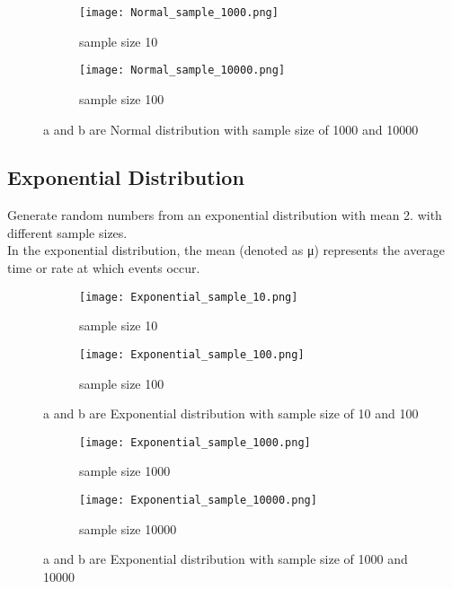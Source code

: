 \documentclass[12pt]{article}
\begin{document}
\begin{figure}[htb!]
    \centering
    \begin{subfigure}{0.45\textwidth}
        \centering
        \texttt{[image: Normal\_sample\_1000.png]}
        \caption{sample size 10}
        \label{fig:sub1}
    \end{subfigure}
    \hfill
    \begin{subfigure}{0.45\textwidth}
        \centering
        \texttt{[image: Normal\_sample\_10000.png]} 
        \caption{sample size 100}
        \label{fig:sub2}
    \end{subfigure}
    \caption{a and b are Normal distribution with sample size of 1000 and 10000}
    \label{fig:main}
\end{figure}

\newpage

\subsection{Exponential Distribution}
Generate random numbers from an exponential distribution with mean 2. with different sample sizes.\\
In the exponential distribution, the mean (denoted as μ) represents the average time or rate at which events occur.

\begin{figure}[htb!]
    \centering
    \begin{subfigure}{0.45\textwidth}
        \centering
        \texttt{[image: Exponential\_sample\_10.png]}
        \caption{sample size 10}
        \label{fig:sub1}
    \end{subfigure}
    \hfill
    \begin{subfigure}{0.45\textwidth}
        \centering
        \texttt{[image: Exponential\_sample\_100.png]} 
        \caption{sample size 100}
        \label{fig:sub2}
    \end{subfigure}
    \caption{a and b are Exponential distribution with sample size of 10 and 100}
    \label{fig:main}
\end{figure}

\begin{figure}[htb!]
    \centering
    \begin{subfigure}{0.45\textwidth}
        \centering
        \texttt{[image: Exponential\_sample\_1000.png]}
        \caption{sample size 1000}
        \label{fig:sub1}
    \end{subfigure}
    \hfill
    \begin{subfigure}{0.45\textwidth}
        \centering
        \texttt{[image: Exponential\_sample\_10000.png]} 
        \caption{sample size 10000}
        \label{fig:sub2}
    \end{subfigure}
    \caption{a and b are Exponential distribution with sample size of 1000 and 10000}
    \label{fig:main}
\end{figure}
\end{document}
